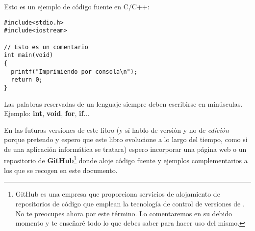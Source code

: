 \begin{ejemplo}
Esto es un ejemplo de código fuente en C/C++:
\begin{lstlisting}
#include<stdio.h>
#include<iostream>
    
// Esto es un comentario
int main(void)
{
  printf("Imprimiendo por consola\n");
  return 0;
}
\end{lstlisting}
\end{ejemplo}

\begin{consejo}
Las palabras reservadas de un lenguaje siempre deben escribirse en minúsculas. Ejemplo: \textbf{int}, \textbf{void}, \textbf{for}, \textbf{if}...
\end{consejo}

En las futuras versiones de este libro (y sí hablo de versión y no de \textit{edición} porque pretendo y espero que 
este libro evolucione a lo largo del tiempo, como si de una aplicación informática se tratara) espero incorporar una página web
o un repositorio de \textbf{GitHub}\footnote{GitHub es una empresa que proporciona servicios de alojamiento de repositorios de 
código que emplean la tecnología de control de versiones de . No te preocupes ahora por este término. Lo comentaremos
en su debido momento y te enseñaré todo lo que debes saber para hacer uso del mismo.} donde aloje código fuente y 
ejemplos complementarios a los que se recogen en este documento.
